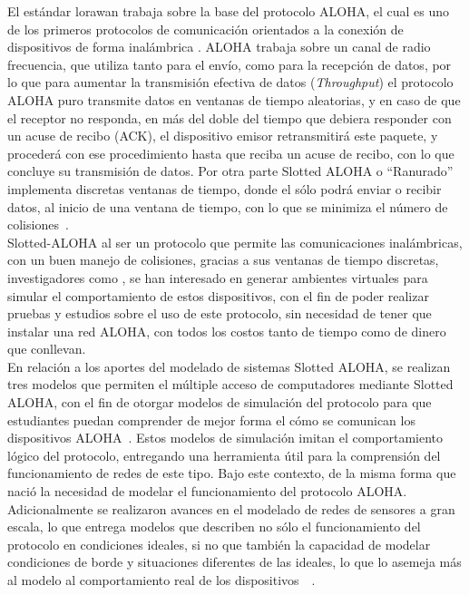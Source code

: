 \begin{justify}
El estándar \gls{lorawan} trabaja sobre la base del protocolo ALOHA, el cual es uno de los primeros protocolos de comunicación orientados a la conexión de dispositivos de forma inalámbrica . ALOHA trabaja sobre un canal de radio frecuencia, que utiliza tanto para el envío, como para la recepción de datos, por lo que para aumentar la transmisión efectiva de datos (\textit{Throughput}) el protocolo ALOHA puro transmite datos en ventanas de tiempo aleatorias, y en caso de que el receptor no responda, en más del doble del tiempo que debiera responder con un acuse de recibo (ACK), el dispositivo emisor retransmitirá este paquete, y procederá con ese procedimiento hasta que reciba un acuse de recibo, con lo que concluye su transmisión de datos. Por otra parte Slotted ALOHA  o ``Ranurado'' implementa discretas ventanas de tiempo, donde el sólo podrá enviar o recibir datos, al inicio de una ventana de tiempo, con lo que se minimiza el número de colisiones~\cite{NORMAN}.\\
Slotted-ALOHA al ser un protocolo que permite las comunicaciones inalámbricas, con un buen manejo de colisiones, gracias a sus ventanas de tiempo discretas, investigadores como \cite{Abdullah}, se han interesado en generar ambientes virtuales para simular el comportamiento de estos dispositivos, con el fin de poder realizar pruebas y estudios sobre el uso de este protocolo, sin necesidad de tener que instalar una red ALOHA, con todos los costos tanto de tiempo como de dinero que conllevan.\\
En relación a los aportes del modelado de sistemas Slotted ALOHA, se realizan tres modelos que permiten el múltiple acceso de computadores mediante Slotted ALOHA, con el fin de otorgar modelos de simulación del protocolo para que estudiantes puedan comprender de mejor forma el cómo se comunican los dispositivos ALOHA~\cite{Abdullah}. Estos modelos de simulación imitan el comportamiento lógico del protocolo, entregando una herramienta útil para la comprensión del funcionamiento de redes de este tipo. Bajo este contexto, de la misma forma que nació la necesidad de modelar el funcionamiento del protocolo ALOHA. Adicionalmente se realizaron avances en el modelado de redes de sensores a gran escala, lo que entrega modelos que describen no sólo el funcionamiento del protocolo en condiciones ideales, si no que también la capacidad de modelar condiciones de borde y situaciones diferentes de las ideales, lo que lo asemeja más al modelo al comportamiento real de los dispositivos~\cite{simulato}~\cite{simubook}.\\

\end{justify}
